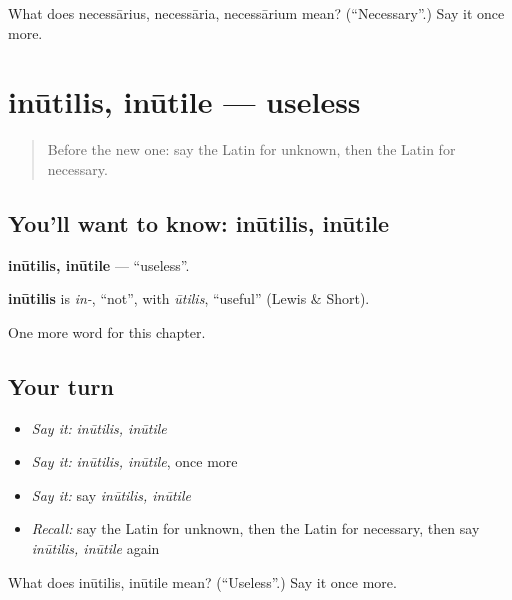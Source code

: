 \begin{tcolorbox}[breakable,colback=teal!4,colframe=teal!35!black,title={Before you move on}]
What does necessārius, necessāria, necessārium mean? (\textquotedblleft{}Necessary\textquotedblright{}.) Say it once more.
\end{tcolorbox}
\section[inūtilis, inūtile]{inūtilis, inūtile — useless}

\label{lesson:LA-C240-inutilis}



\begin{quote}
Before the new one: say the Latin for unknown, then the Latin for necessary.
\end{quote}

\subsection*{You'll want to know: inūtilis, inūtile}
\textbf{inūtilis, inūtile} — \textquotedblleft{}useless\textquotedblright{}.

\begin{cousinweb}
\textbf{inūtilis} is \emph{in-}, \textquotedblleft{}not\textquotedblright{}, with \emph{ūtilis}, \textquotedblleft{}useful\textquotedblright{} (Lewis \& Short).
\end{cousinweb}

\begin{grammarlens}[title={What you've built}]
One more word for this chapter.
\end{grammarlens}

\subsection*{Your turn}
\begin{itemize}
\raggedright
  \item \emph{Say it:} \emph{inūtilis, inūtile}
  \item \emph{Say it:} \emph{inūtilis, inūtile}, once more
  \item \emph{Say it:} say \emph{inūtilis, inūtile}
  \item \emph{Recall:} say the Latin for unknown, then the Latin for necessary, then say \emph{inūtilis, inūtile} again
\end{itemize}

\begin{tcolorbox}[breakable,colback=teal!4,colframe=teal!35!black,title={Before you move on}]
What does inūtilis, inūtile mean? (\textquotedblleft{}Useless\textquotedblright{}.) Say it once more.
\end{tcolorbox}
